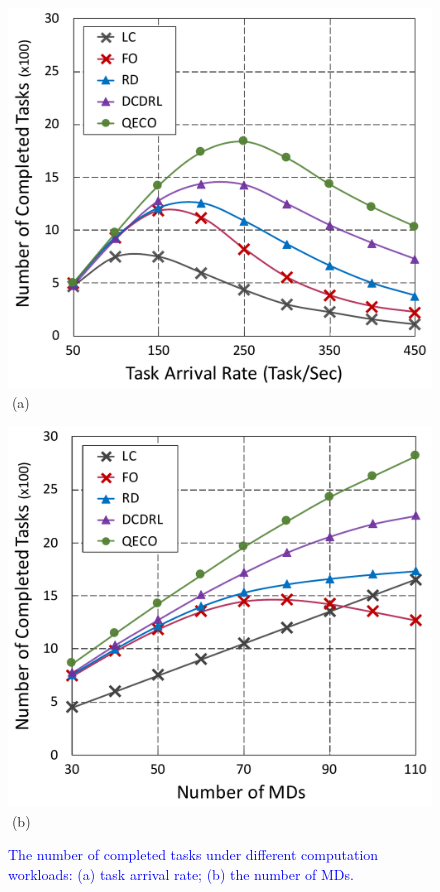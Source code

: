 \documentclass[10pt, journal,letterpaper]{IEEEtran}
\begin{document}
 \begin{figure}[tbp]
	\captionsetup{name=Fig.}
	\begin{minipage}[b]{0.5\linewidth}
		\centering
		\includegraphics[width=\textwidth]{ drop_1} 
		\textcolor{white}{i}\hspace{0.6cm}(a)
	\end{minipage}
	\hspace{-0.2cm}
	\begin{minipage}[b]{0.5\linewidth}
		\centering
		\includegraphics[width=\textwidth]{ drop_2}
		\textcolor{white}{i}\hspace{0.6cm}(b)
	\end{minipage}
	\vspace{-0.65cm}
	\caption{\textcolor{blue}{The number of completed tasks under different computation workloads: (a) task arrival rate; (b) the number of MDs.}}
	\label{chart1}
\end{figure}
\end{document}
